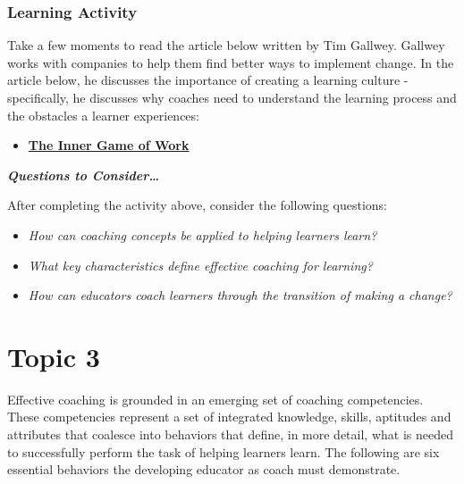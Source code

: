 \documentclass[
]{book}
\providecommand{\tightlist}{%
  \setlength{\itemsep}{0pt}\setlength{\parskip}{0pt}}
\begin{document}
\begin{reflect}
\hypertarget{learning-activity-11}{%
\subsubsection*{Learning Activity}\label{learning-activity-11}}

Take a few moments to read the article below written by Tim Gallwey. Gallwey works with companies to help them find better ways to implement change. In the article below, he discusses the importance of creating a learning culture - specifically, he discusses why coaches need to understand the learning process and the obstacles a learner experiences:

\begin{itemize}
\tightlist
\item
  \href{https://thesystemsthinker.com/the-inner-game-of-work-building-capability-in-the-workplace/}{\textbf{The Inner Game of Work}}
\end{itemize}

\textbf{\emph{Questions to Consider\ldots{}}}

After completing the activity above, consider the following questions:

\begin{itemize}
\tightlist
\item
  \emph{How can coaching concepts be applied to helping learners learn?}
\item
  \emph{What key characteristics define effective coaching for learning?}
\item
  \emph{How can educators coach learners through the transition of making a change?}
\end{itemize}
\end{reflect}

\hypertarget{topic-3}{%
\section*{Topic 3}\label{topic-3}}

Effective coaching is grounded in an emerging set of coaching competencies. These competencies represent a set of integrated knowledge, skills, aptitudes and attributes that coalesce into behaviors that define, in more detail, what is needed to successfully perform the task of helping learners learn. The following are six essential behaviors the developing educator as coach must demonstrate.
\end{document}
